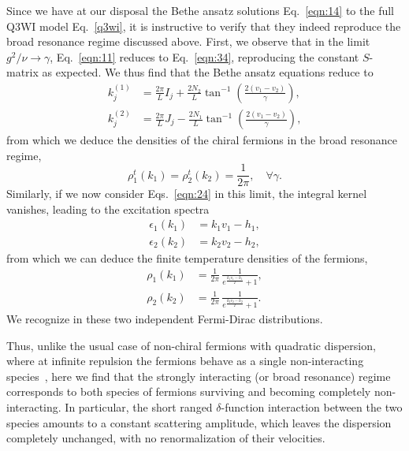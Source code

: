 \documentclass[aps,pra,
superscriptaddress,
reprint,twocolumn,preprintnumbers,
amsmath,amssymb,
nofootinbib]{revtex4-1}
\begin{document}
Since we have at our disposal the Bethe ansatz solutions Eq.~\eqref{eqn:14} to the full Q3WI model Eq.~\eqref{q3wi}, it is instructive to verify that they indeed reproduce the broad resonance regime discussed above. First, we observe that in the limit $g^2/\nu\to\gamma$, Eq.~\eqref{eqn:11} reduces to Eq.~\eqref{eqn:34}, reproducing the constant $S$-matrix as expected. We thus find that the Bethe ansatz equations reduce to
		\begin{align}
		k^{(1)}_j & =  \frac{2 \pi}{L} I_j + \frac{2 N_2}{L} \tan^{-1}\left( \frac{2(v_1 - v_2)}{\gamma}\right), \nonumber \\
		k^{(2)}_j & =  \frac{2 \pi}{L} J_j - \frac{2 N_1}{L} \tan^{-1}\left( \frac{2(v_1 - v_2)}{\gamma}\right),
		\end{align}
from which we deduce the densities of the chiral fermions in the broad resonance regime,
		\begin{equation}
		\rho_1^t(k_1) = \rho_2^t(k_2) = \frac{1}{2\pi}, \quad \forall \gamma.
		\end{equation}
Similarly, if we now consider Eqs.~\eqref{eqn:24} in this limit, the integral kernel vanishes, leading to the excitation spectra
		\begin{align}
		\epsilon_1(k_1) & =  k_1 v_1 - h_1 , \nonumber \\
		\epsilon_2(k_2) & =  k_2 v_2 -  h_2 ,
		\end{align}
from which we can deduce the finite temperature densities of the fermions,
		\begin{align}
		\rho_1(k_1) & =  \frac{1}{2\pi}\,\frac{1}{e^{\frac{k_1 v_1 - h_1}{T}} + 1},	\nonumber \\
		\rho_2(k_2) & =  \frac{1}{2\pi}\,\frac{1}{e^{\frac{k_2 v_2 - h_2}{T}} + 1}.	
		\end{align}
We recognize in these two independent Fermi-Dirac distributions.

Thus, unlike the usual case of non-chiral fermions with quadratic dispersion, where at infinite repulsion the fermions behave as a single non-interacting species~\cite{Takahashi1999}, here we find that the strongly interacting (or broad resonance) regime corresponds to both species of fermions surviving and becoming completely non-interacting. In particular, the short ranged $\delta$-function interaction between the two species amounts to a constant scattering amplitude, which leaves the dispersion completely unchanged, with no renormalization of their velocities. 

\end{document}
